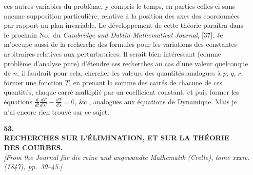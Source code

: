 \documentclass[11pt]{article}
\begin{document}
ces autres variables du probl\`eme, y compris le temps, en parties celles-ci sans aucune
supposition particuli\`ere, relative \`a la position des axes des coordonn\'ees par rapport au
plan invariable. Le d\'eveloppement de cette th\'eorie para\^itra dans le prochain No.\ du
\textit{Cambridge and Dublin Mathematical Journal}, [37]. Je m'occupe aussi de la recherche des
formules pour les variations des constantes arbitraires relatives aux perturbatrices. Il
serait bien int\'eressant (comme probl\`eme d'analyse pure) d'\'etendre ces recherches au cas
d'une valeur quelconque de $n$; il faudrait pour cela, chercher les valeurs des quantit\'es
analogues \`a $p$, $q$, $r$, former une fonction $T$, en prenant la somme des carr\'es de chacune
de ces quantit\'es, chaque carr\'e multipli\'e par un coefficient constant, et puis former les
\'equations $\tfrac{d}{dt}\tfrac{dT}{d\lambda'} - \tfrac{dT}{d\lambda} = 0$, \&c., analogues aux \'equations de Dynamique. Mais je n'ai
encore rien trouv\'e sur ce sujet.

\bigskip

\begin{center}
\textbf{\large 53.}\\[0.7em]
\textbf{\large RECHERCHES SUR L'\'ELIMINATION, ET SUR LA TH\'EORIE\\
DES COURBES.}\\[0.5em]
\textit{[From the Journal f\"ur die reine und angewandte Mathematik (Crelle), tome xxxiv.\\
(1847), pp.~30--45.]}
\end{center}

\medskip
\end{document}
